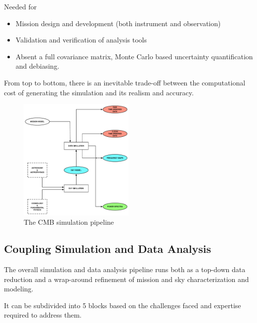 Needed for 
\begin{itemize}
\item Mission design and development (both instrument and observation)
\item Validation and verification of analysis tools
\item Absent a full covariance matrix, Monte Carlo based uncertainty quantification and debiasing.
\end{itemize}

From top to bottom, there is an inevitable trade-off between the computational cost of generating the simulation and its realism and accuracy.

\begin{figure}[htbp]
\includegraphics[width=0.5\textwidth]{Analysis/sim}
\caption{The CMB simulation pipeline}
\label{default}

\end{figure}

\newpage

\subsection{Coupling Simulation and Data Analysis}

The overall simulation and data analysis pipeline runs both as a top-down data reduction and a wrap-around refinement of mission and sky characterization and modeling.

It can be subdivided into 5 blocks based on the challenges faced and expertise required to address them.

